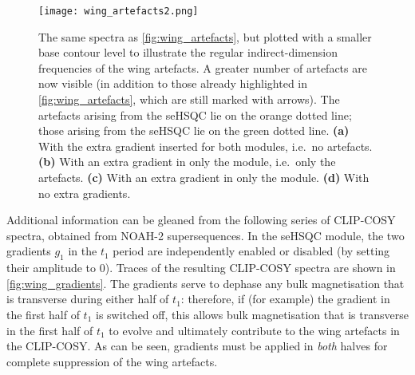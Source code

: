 \begin{figure}
    \centering
    \texttt{[image: wing\_artefacts2.png]}
    \caption{
        The same spectra as \cref{fig:wing_artefacts}, but plotted with a smaller base contour level to illustrate the regular indirect-dimension frequencies of the wing artefacts.
        A greater number of artefacts are now visible (in addition to those already highlighted in \cref{fig:wing_artefacts}, which are still marked with arrows).
        The artefacts arising from the \nitrogen{} seHSQC lie on the orange dotted line; those arising from the \carbon{} seHSQC lie on the green dotted line.
        \textbf{(a)} With the extra gradient inserted for both modules, i.e.\ no artefacts.
        \textbf{(b)} With an extra gradient in only the \nitrogen{} module, i.e.\ only the \carbon{} artefacts.
        \textbf{(c)} With an extra gradient in only the \carbon{} module.
        \textbf{(d)} With no extra gradients.
        \grami{}
    }
    \label{fig:wing_artefacts2}
\end{figure}

\clearpage

Additional information can be gleaned from the following series of CLIP-COSY spectra, obtained from NOAH-2  supersequences.
In the seHSQC module, the two gradients $g_1$ in the $t_1$ period are independently enabled or disabled (by setting their amplitude to 0).
Traces of the resulting CLIP-COSY spectra are shown in \cref{fig:wing_gradients}.
The gradients serve to dephase any bulk  magnetisation that is transverse during either half of $t_1$: therefore, if (for example) the gradient in the first half of $t_1$ is switched off, this allows bulk magnetisation that is transverse in the first half of $t_1$ to evolve and ultimately contribute to the wing artefacts in the CLIP-COSY.
As can be seen, gradients must be applied in \textit{both} halves for complete suppression of the wing artefacts.

